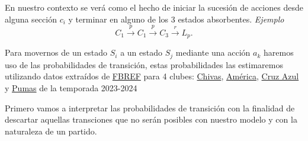 \documentclass[
  us-letterpaper,
  DIV=11,
  numbers=noendperiod]{scrreprt}
\begin{document}
En nuestro contexto se verá como el hecho de iniciar la sucesión de
acciones desde alguna sección \(c_i\) y terminar en alguno de los 3
estados absorbentes. \emph{Ejemplo} \[
C_1\xrightarrow{p}C_1\xrightarrow{p}C_3\xrightarrow{r}L_p.
\]

Para movernos de un estado \(S_i\) a un estado \(S_j\) mediante una
acción \(a_k\) haremos uso de las probabilidades de transición, estas
probabilidades las estimaremos utilizando datos extraídos de
\href{https://fbref.com/es/}{FBREF} para 4 clubes:
\href{https://fbref.com/es/equipos/c02b0f7a/2023-2024/Estadisticas-de-Guadalajara}{Chivas},
\href{https://fbref.com/es/equipos/18d3c3a3/2023-2024/Estadisticas-de-America}{América},
\href{https://fbref.com/es/equipos/632f1838/2023-2024/Estadisticas-de-Cruz-Azul}{Cruz
Azul} y
\href{https://fbref.com/es/equipos/c9d59c6c/2023-2024/Estadisticas-de-Pumas-UNAM}{Pumas}
de la temporada 2023-2024

Primero vamos a interpretar las probabilidades de transición con la
finalidad de descartar aquellas transciones que no serán posibles con
nuestro modelo y con la naturaleza de un partido.
\end{document}
